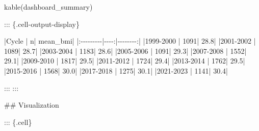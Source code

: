 \documentclass[
  letterpaper,
  DIV=11,
  numbers=noendperiod,
  oneside]{scrreprt}
\newenvironment{Shaded}{\begin{snugshade}}{\end{snugshade}}
\newcommand{\FunctionTok}[1]{\textcolor[rgb]{0.28,0.35,0.67}{#1}}
\newcommand{\InformationTok}[1]{\textcolor[rgb]{0.37,0.37,0.37}{#1}}
\newcommand{\NormalTok}[1]{\textcolor[rgb]{0.00,0.23,0.31}{#1}}
\newcommand{\PreprocessorTok}[1]{\textcolor[rgb]{0.68,0.00,0.00}{#1}}
\begin{document}
\begin{Shaded}
\begin{Highlighting}[numbers=left,,]
\FunctionTok{kable}\NormalTok{(dashboard\_summary)}
\InformationTok{\textasciigrave{}\textasciigrave{}\textasciigrave{}}

\NormalTok{::: \{.cell{-}output{-}display\}}


\PreprocessorTok{|}\NormalTok{Cycle     }\PreprocessorTok{|}\NormalTok{    n}\PreprocessorTok{|}\NormalTok{ mean\_bmi}\PreprocessorTok{|}
\PreprocessorTok{|:{-}{-}{-}{-}{-}{-}{-}{-}{-}|{-}{-}{-}{-}:|{-}{-}{-}{-}{-}{-}{-}{-}:|}
\PreprocessorTok{|}\NormalTok{1999{-}2000 }\PreprocessorTok{|}\NormalTok{ 1091}\PreprocessorTok{|}\NormalTok{     28.8}\PreprocessorTok{|}
\PreprocessorTok{|}\NormalTok{2001{-}2002 }\PreprocessorTok{|}\NormalTok{ 1089}\PreprocessorTok{|}\NormalTok{     28.7}\PreprocessorTok{|}
\PreprocessorTok{|}\NormalTok{2003{-}2004 }\PreprocessorTok{|}\NormalTok{ 1183}\PreprocessorTok{|}\NormalTok{     28.6}\PreprocessorTok{|}
\PreprocessorTok{|}\NormalTok{2005{-}2006 }\PreprocessorTok{|}\NormalTok{ 1091}\PreprocessorTok{|}\NormalTok{     29.3}\PreprocessorTok{|}
\PreprocessorTok{|}\NormalTok{2007{-}2008 }\PreprocessorTok{|}\NormalTok{ 1552}\PreprocessorTok{|}\NormalTok{     29.1}\PreprocessorTok{|}
\PreprocessorTok{|}\NormalTok{2009{-}2010 }\PreprocessorTok{|}\NormalTok{ 1817}\PreprocessorTok{|}\NormalTok{     29.5}\PreprocessorTok{|}
\PreprocessorTok{|}\NormalTok{2011{-}2012 }\PreprocessorTok{|}\NormalTok{ 1724}\PreprocessorTok{|}\NormalTok{     29.4}\PreprocessorTok{|}
\PreprocessorTok{|}\NormalTok{2013{-}2014 }\PreprocessorTok{|}\NormalTok{ 1762}\PreprocessorTok{|}\NormalTok{     29.5}\PreprocessorTok{|}
\PreprocessorTok{|}\NormalTok{2015{-}2016 }\PreprocessorTok{|}\NormalTok{ 1568}\PreprocessorTok{|}\NormalTok{     30.0}\PreprocessorTok{|}
\PreprocessorTok{|}\NormalTok{2017{-}2018 }\PreprocessorTok{|}\NormalTok{ 1275}\PreprocessorTok{|}\NormalTok{     30.1}\PreprocessorTok{|}
\PreprocessorTok{|}\NormalTok{2021{-}2023 }\PreprocessorTok{|}\NormalTok{ 1141}\PreprocessorTok{|}\NormalTok{     30.4}\PreprocessorTok{|}


\NormalTok{:::}
\NormalTok{:::}


\FunctionTok{\#\# Visualization}


\NormalTok{::: \{.cell\}}


\end{Highlighting}
\end{Shaded}
\end{document}
